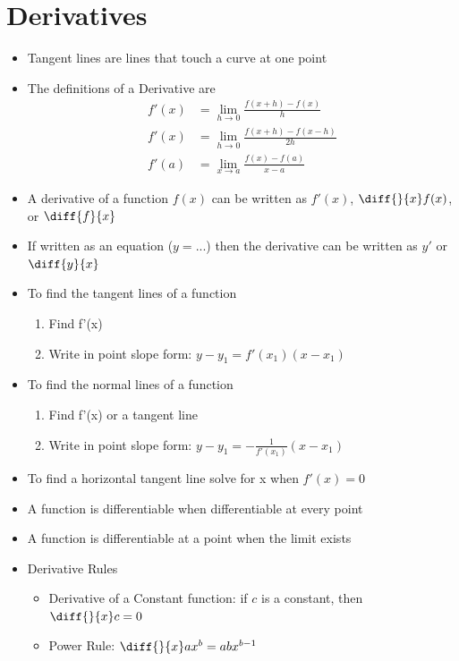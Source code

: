 \documentclass{article}
\begin{document}
\newpage
\section{Derivatives}
\begin{itemize}
    \item Tangent lines are lines that touch a curve at one point
    \item The definitions of a Derivative are
    \begin{align*}
        f'(x) &= \lim_{h\to 0} \frac{f(x+h) - f(x)}{h} \\
        f'(x) &= \lim_{h\to 0} \frac{f(x+h) - f(x-h)}{2h} \\
        f'(a) &= \lim_{x\to a} \frac{f(x) - f(a)}{x-a}
    \end{align*}
    
    \item A derivative of a function $f(x)$ can be written as $f'(x)$, $\diff{}{x} f(x)$, or $\diff{f}{x}$
    \item If written as an equation ($y=$...) then the derivative can be written as $y'$ or $\diff{y}{x}$
    \item To find the tangent lines of a function
    \begin{enumerate}
        \item Find f'(x)
        \item Write in point slope form: $y - y_1 = f'(x_1)(x - x_1)$
    \end{enumerate}
    \item To find the normal lines of a function
    \begin{enumerate}
        \item Find f'(x) or a tangent line
        \item Write in point slope form: $y - y_1 = -\frac{1}{f'(x_1)}(x - x_1)$
    \end{enumerate}
    \item To find a horizontal tangent line solve for x when $f'(x) = 0$
    \item A function is differentiable when differentiable at every point
    \item A function is differentiable at a point when the limit exists 
    \item Derivative Rules
    \begin{itemize}
        \item Derivative of a Constant function: if $c$ is a constant, then $\diff{}{x} c = 0$
        \item Power Rule: $\diff{}{x} ax^b = abx^{b-1}$

\end{itemize}
\end{itemize}
\end{document}
